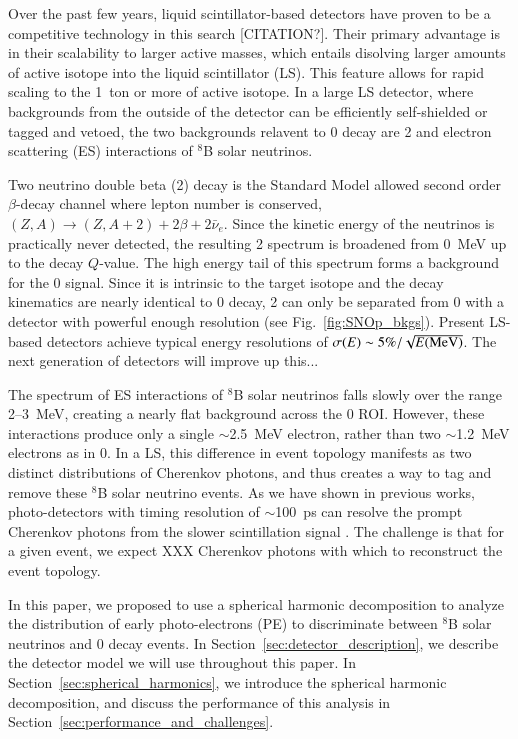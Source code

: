 Over the past few years, liquid scintillator-based detectors have
proven to be a competitive technology in this search
[CITATION?]. Their primary advantage is in their scalability to larger
active masses, which entails disolving larger amounts of active
isotope into the liquid scintillator (LS). This feature allows for
rapid scaling to the 1~ton or more of active isotope. In a large LS
detector, where backgrounds from the outside of the detector can be
efficiently self-shielded or tagged and vetoed, the two backgrounds
relavent to 0{\nbb} decay are 2{\nbb} and electron scattering (ES) interactions of $^{8}$B solar neutrinos.

Two neutrino double beta (2{\nbb}) decay is the Standard Model allowed
second order $\beta$-decay channel where lepton number is conserved,
\mbox{$(Z,A)\rightarrow(Z,A+2)+2\beta+2\bar\nu_e$}. Since the kinetic
energy of the neutrinos is practically never detected, the resulting
2{\nbb} spectrum is broadened from 0~MeV up to the decay
$Q$-value. The high energy tail of this spectrum forms a background
for the 0{\nbb} signal. Since it is intrinsic to the target isotope
and the decay kinematics are nearly identical to 0{\nbb} decay,
2{\nbb} can only be separated from 0{\nbb} with a detector with
powerful enough resolution (see Fig.~\ref{fig:SNOp_bkgs}). Present
LS-based detectors achieve typical energy resolutions of
\mbox{$\sigma(E)\sim 5\%/\sqrt{E(\rm MeV)}$}. The next generation of
detectors will improve up this... 
  
  
The spectrum of ES interactions of $^{8}$B solar neutrinos falls
slowly over the range 2--3~MeV, creating a nearly flat background
across the 0{\nbb} ROI. However, these interactions produce only a
single $\sim$2.5~MeV electron, rather than two $\sim$1.2~MeV electrons
as in 0{\nbb}. In a LS, this difference in event topology manifests as
two distinct distributions of Cherenkov photons, and thus creates a
way to tag and remove these $^{8}$B solar neutrino events. As we have
shown in previous works, photo-detectors with timing resolution of
$\sim$100~ps can resolve the prompt Cherenkov photons from the slower
scintillation signal \cite{Aberle2014}. The challenge is that for a
given event, we expect XXX Cherenkov photons with which to reconstruct
the event topology.

In this paper, we proposed to use a spherical harmonic decomposition
to analyze the distribution of early photo-electrons (PE) to
discriminate between $^{8}$B solar neutrinos and 0{\nbb} decay
events. In Section~\ref{sec:detector_description}, we describe the
detector model we will use throughout this paper. In
Section~\ref{sec:spherical_harmonics}, we introduce the spherical
harmonic decomposition, and discuss the performance of this analysis
in Section~\ref{sec:performance_and_challenges}.




